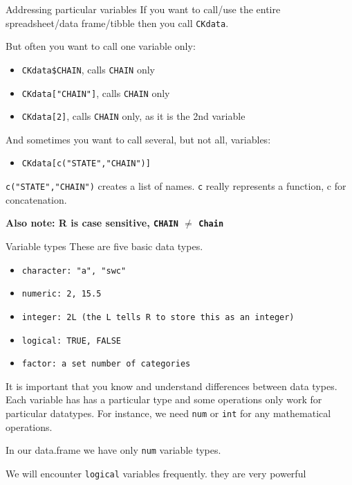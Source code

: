 \documentclass[
  ignorenonframetext,
]{beamer}
\providecommand{\tightlist}{%
  \setlength{\itemsep}{0pt}\setlength{\parskip}{0pt}}
\begin{document}
\begin{frame}{Addressing particular variables}
\protect\hypertarget{addressing-particular-variables}{}
If you want to call/use the entire spreadsheet/data frame/tibble then
you call \texttt{CKdata}.

But often you want to call one variable only:

\begin{itemize}
\tightlist
\item
  \texttt{CKdata\$CHAIN}, calls \texttt{CHAIN} only
\item
  \texttt{CKdata["CHAIN"]}, calls \texttt{CHAIN} only
\item
  \texttt{CKdata[2]}, calls \texttt{CHAIN} only, as it is the 2nd
  variable
\end{itemize}

And sometimes you want to call several, but not all, variables:

\begin{itemize}
\tightlist
\item
  \texttt{CKdata[c("STATE","CHAIN")]}
\end{itemize}

\texttt{c("STATE","CHAIN")} creates a list of names. \texttt{c} really
represents a function, c for concatenation.

\textbf{Also note: R is case sensitive, \texttt{CHAIN} $\neq$ \texttt{Chain}}
\end{frame}

\begin{frame}{Variable types}
\protect\hypertarget{variable-types}{}
These are five basic data types.

\begin{itemize}
  \item \texttt{character: "a", "swc"}
  \item \texttt{numeric: 2, 15.5}
  \item \texttt{integer: 2L (the L tells R to store this as an integer)}
  \item \texttt{logical: TRUE, FALSE}
  \item \texttt{factor: a set number of categories}
\end{itemize}

It is important that you know and understand differences between data
types. Each variable has has a particular type and some operations only
work for particular datatypes. For instance, we need \texttt{num} or
\texttt{int} for any mathematical operations.

In our data.frame we have only \texttt{num} variable types.

We will encounter \texttt{logical} variables frequently.
\textcolor{student}{they are very powerful}
\end{frame}
\end{document}
